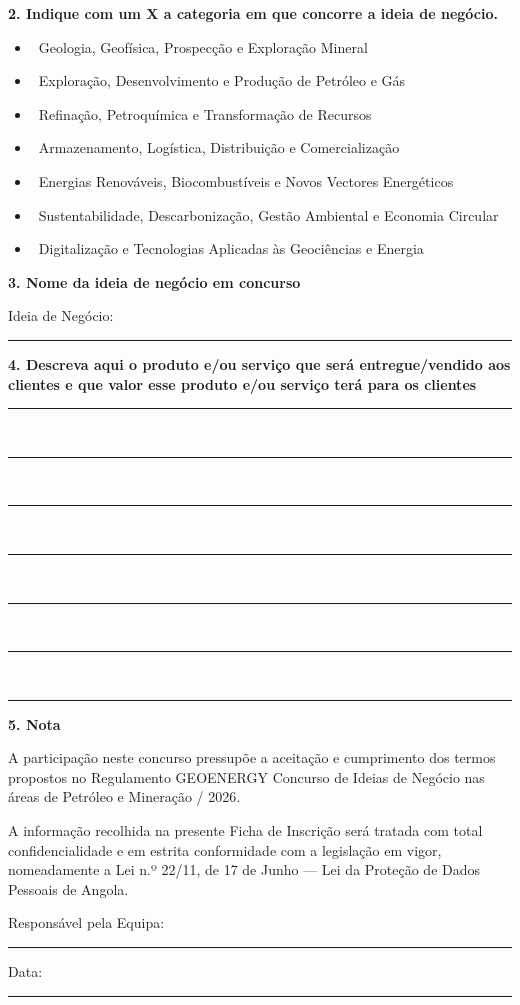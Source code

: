 \documentclass[11pt,a4paper]{article}
\newcommand{\blankline}[1]{\rule{#1}{0.5pt}}
\newcommand{\checkbox}{\fbox{\rule{0pt}{1.2ex}\hspace{1.2ex}}}
\begin{document}
\vspace{1em}

\textbf{2. Indique com um X a categoria em que concorre a ideia de negócio.}

\begin{itemize}[leftmargin=2em,itemsep=0.6em]
    \item \checkbox\ Geologia, Geofísica, Prospecção e Exploração Mineral
    \item \checkbox\ Exploração, Desenvolvimento e Produção de Petróleo e Gás
    \item \checkbox\ Refinação, Petroquímica e Transformação de Recursos
    \item \checkbox\ Armazenamento, Logística, Distribuição e Comercialização
    \item \checkbox\ Energias Renováveis, Biocombustíveis e Novos Vectores Energéticos
    \item \checkbox\ Sustentabilidade, Descarbonização, Gestão Ambiental e Economia Circular
    \item \checkbox\ Digitalização e Tecnologias Aplicadas às Geociências e Energia
\end{itemize}

\vspace{0.8em}

\textbf{3. Nome da ideia de negócio em concurso}

\noindent Ideia de Negócio: \blankline{12.5cm}

\vspace{1em}

\textbf{4. Descreva aqui o produto e/ou serviço que será entregue/vendido aos clientes e que valor esse produto e/ou serviço terá para os clientes}

\vspace{0.4em}
\noindent\begin{minipage}{\textwidth}
\blankline{17cm}\\[0.32em]
\blankline{17cm}\\[0.32em]
\blankline{17cm}\\[0.32em]
\blankline{17cm}\\[0.32em]
\blankline{17cm}\\[0.32em]
\blankline{17cm}\\[0.32em]
\blankline{17cm}
\end{minipage}

\vspace{1em}
\textbf{5. Nota}

A participação neste concurso pressupõe a aceitação e cumprimento dos termos propostos no Regulamento GEOENERGY Concurso de Ideias de Negócio nas áreas de Petróleo e Mineração / 2026.

A informação recolhida na presente Ficha de Inscrição será tratada com total confidencialidade e em estrita conformidade com a legislação em vigor, nomeadamente a Lei n.º 22/11, de 17 de Junho — Lei da Proteção de Dados Pessoais de Angola.

\vspace{1em}
\noindent Responsável pela Equipa: \blankline{6.7cm} \hfill Data: \blankline{4.5cm}
\end{document}
